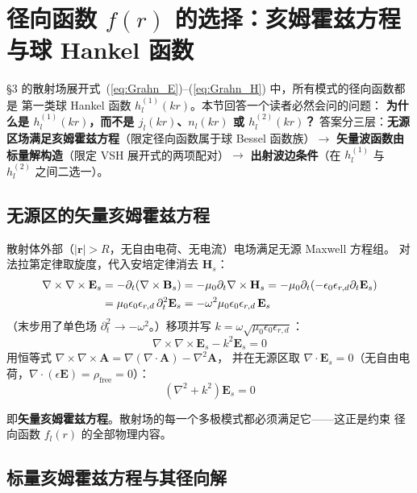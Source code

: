\section{径向函数 $f(r)$ 的选择：亥姆霍兹方程与球 Hankel 函数}

\S3 的散射场展开式~(\ref{eq:Grahn_E})--(\ref{eq:Grahn_H}) 中，所有模式的径向函数都是
第一类球 Hankel 函数 $h_l^{(1)}(kr)$。本节回答一个读者必然会问的问题：
\textbf{为什么是 $h_l^{(1)}(kr)$，而不是 $j_l(kr)$、$n_l(kr)$ 或 $h_l^{(2)}(kr)$？}
答案分三层：\textbf{无源区场满足亥姆霍兹方程}（限定径向函数属于球 Bessel 函数族）$\to$
\textbf{矢量波函数由标量解构造}（限定 VSH 展开式的两项配对）$\to$
\textbf{出射波边条件}（在 $h_l^{(1)}$ 与 $h_l^{(2)}$ 之间二选一）。

\subsection{无源区的矢量亥姆霍兹方程}

散射体外部（$|\mathbf{r}|>R$，无自由电荷、无电流）电场满足无源 Maxwell 方程组。
对法拉第定律取旋度，代入安培定律消去 $\mathbf{H}_s$：
\begin{align}
  \nabla\times\nabla\times\mathbf{E}_s &= -\partial_t(\nabla\times\mathbf{B}_s)
    = -\mu_0\partial_t\nabla\times\mathbf{H}_s = -\mu_0\partial_t(-\epsilon_0\epsilon_{r,d}\partial_t\mathbf{E}_s) \notag\\
  &= \mu_0\epsilon_0\epsilon_{r,d}\,\partial_t^2\mathbf{E}_s
    = -\omega^2\mu_0\epsilon_0\epsilon_{r,d}\,\mathbf{E}_s
\end{align}
（末步用了单色场 $\partial_t^2\to-\omega^2$。）移项并写 $k=\omega\sqrt{\mu_0\epsilon_0\epsilon_{r,d}}$：
\begin{equation}
  \nabla\times\nabla\times\mathbf{E}_s - k^2\mathbf{E}_s = 0
\end{equation}
用恒等式 $\nabla\times\nabla\times\mathbf{A}=\nabla(\nabla\cdot\mathbf{A})-\nabla^2\mathbf{A}$，
并在无源区取 $\nabla\cdot\mathbf{E}_s=0$（无自由电荷，$\nabla\cdot(\epsilon\mathbf{E})=\rho_{\text{free}}=0$）：
\begin{equation}
  \boxed{\;(\nabla^2+k^2)\mathbf{E}_s = 0\;}
  \label{eq:appB_helmholtz}
\end{equation}

即\textbf{矢量亥姆霍兹方程}。散射场的每一个多极模式都必须满足它——这正是约束
径向函数 $f_l(r)$ 的全部物理内容。

\subsection{标量亥姆霍兹方程与其径向解}

